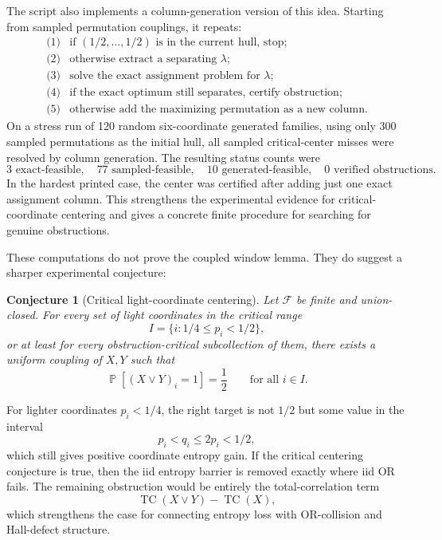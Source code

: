 \documentclass[11pt]{article}
\newtheorem{conjecture}{Conjecture}
\DeclareMathOperator{\TC}{TC}
\DeclareMathOperator{\Prb}{\mathbb{P}}
\begin{document}
The script also implements a column-generation version of this idea.  Starting
from sampled permutation couplings, it repeats:
\[
\begin{array}{ll}
  \text{(1)} & \text{if }(1/2,\dots,1/2)\text{ is in the current hull, stop;}\\
  \text{(2)} & \text{otherwise extract a separating }\lambda;\\
  \text{(3)} & \text{solve the exact assignment problem for }\lambda;\\
  \text{(4)} & \text{if the exact optimum still separates, certify obstruction;}\\
  \text{(5)} & \text{otherwise add the maximizing permutation as a new column.}
\end{array}
\]
On a stress run of 120 random six-coordinate generated families, using only
300 sampled permutations as the initial hull, all sampled critical-center
misses were resolved by column generation.  The resulting status counts were
\[
  3\text{ exact-feasible},\quad
  77\text{ sampled-feasible},\quad
  10\text{ generated-feasible},\quad
  0\text{ verified obstructions}.
\]
In the hardest printed case, the center was certified after adding just one
exact assignment column.  This strengthens the experimental evidence for
critical-coordinate centering and gives a concrete finite procedure for
searching for genuine obstructions.

These computations do not prove the coupled window lemma.  They do suggest a
sharper experimental conjecture:

\begin{conjecture}[Critical light-coordinate centering]
Let $\mathcal{F}$ be finite and union-closed.  For every set of light
coordinates in the critical range
\[
  I=\{i:1/4\le p_i<1/2\},
\]
or at least for every obstruction-critical subcollection of them, there exists
a uniform coupling of $X,Y$ such that
\[
  \Prb[(X\vee Y)_i=1]=\frac12
  \qquad\text{for all } i\in I.
\]
\end{conjecture}

For lighter coordinates $p_i<1/4$, the right target is not $1/2$ but some
value in the interval
\[
  p_i<q_i\le 2p_i<1/2,
\]
which still gives positive coordinate entropy gain.  If the critical
centering conjecture is true, then the iid entropy barrier is removed exactly
where iid OR fails.  The remaining obstruction would be entirely the
total-correlation term
\[
  \TC(X\vee Y)-\TC(X),
\]
which strengthens the case for connecting entropy loss with OR-collision and
Hall-defect structure.
\end{document}
